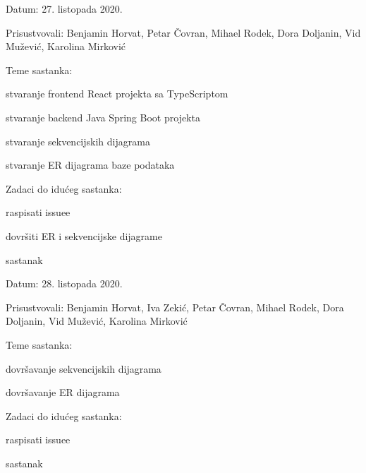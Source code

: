 \begin{packed_enum}
		\item[] \begin{packed_item}
			\item Datum: 27. listopada 2020.
			\item Prisustvovali: Benjamin Horvat, Petar Čovran, Mihael Rodek, Dora Doljanin, Vid Mužević, Karolina Mirković
			\item Teme sastanka:
			\begin{packed_item}
				\item  stvaranje frontend React projekta sa TypeScriptom
				\item  stvaranje backend Java Spring Boot projekta
				\item  stvaranje sekvencijskih dijagrama
				\item  stvaranje ER dijagrama baze podataka
			\end{packed_item}
			\item Zadaci do idućeg sastanka:
			\begin{packed_item}
				\item  raspisati issuee 
				\item  dovršiti ER i sekvencijske dijagrame
			\end{packed_item}
		\end{packed_item}
	
		\item  sastanak
		
		\item[] \begin{packed_item}
			\item Datum: 28. listopada 2020.
			\item Prisustvovali: Benjamin Horvat, Iva Zekić, Petar Čovran, Mihael Rodek, Dora Doljanin, Vid Mužević, Karolina Mirković
			\item Teme sastanka:
			\begin{packed_item}
				\item  dovršavanje sekvencijskih dijagrama
				\item  dovršavanje ER dijagrama
			\end{packed_item}
			\item Zadaci do idućeg sastanka:
			\begin{packed_item}
				\item  raspisati issuee 
			\end{packed_item}
		\end{packed_item}
		
		\item sastanak
		

\end{packed_enum}
